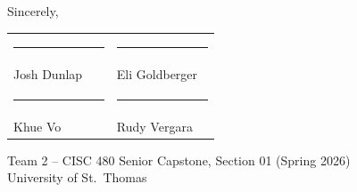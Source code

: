 \documentclass[11pt,letterpaper]{article}
\begin{document}
\vspace{1em}

Sincerely,

\vspace{3em}

\begin{tabular}{@{}p{0.45\linewidth}p{0.45\linewidth}@{}}
\rule{0.4\linewidth}{0.4pt} & \rule{0.4\linewidth}{0.4pt} \\
Josh Dunlap & Eli Goldberger \\[1.5em]
\rule{0.4\linewidth}{0.4pt} & \rule{0.4\linewidth}{0.4pt} \\
Khue Vo & Rudy Vergara \\
\end{tabular}

\vspace{1em}
Team 2 -- CISC 480 Senior Capstone, Section 01 (Spring 2026) \\
University of St.\ Thomas
\end{document}
